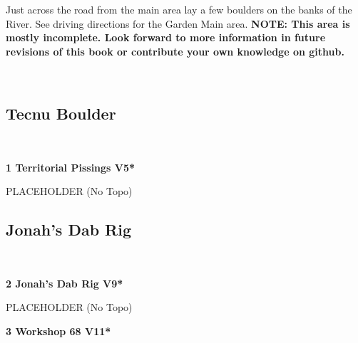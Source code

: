 \raggedcolumns
\begin{multicols}{2}
\begin{minipage}{\columnwidth}
Just across the road from the main area lay a few boulders on the banks of the River. See driving directions for the Garden Main area.
\textbf{NOTE: This area is mostly incomplete. Look forward to more information in future revisions of this book or contribute your own knowledge on github.}
\end{minipage}

\newpage
	\begin{minipage}{\columnwidth}
	\
	\end{minipage}
	
			\begin{minipage}{\columnwidth}
			\subsection*{Tecnu Boulder}\label{bf:Tecnu Boulder}
			\
			
			\end{minipage}
			
					\begin{minipage}{\linewidth}	
					\label{rt:Territorial Pissings}
\colorbox{RoyalBlue!20}{
\parbox{0.95\textwidth}{
\textbf{
1 Territorial Pissings V5*  
}
}
}

					\begin{adjustwidth}{0.5cm}{}				
					PLACEHOLDER
						\newline (No Topo) 
					\end{adjustwidth}
					\end{minipage}
			\begin{minipage}{\columnwidth}
			\subsection*{Jonah's Dab Rig}\label{bf:Jonah's Dab Rig}
			\
			
			\end{minipage}
			
					\begin{minipage}{\linewidth}	
					\label{rt:Jonah's Dab Rig}
\colorbox{Goldenrod!50}{
\parbox{0.95\textwidth}{
\textbf{
2 Jonah's Dab Rig V9*  
}
}
}

					\begin{adjustwidth}{0.5cm}{}				
					PLACEHOLDER
						\newline (No Topo) 
					\end{adjustwidth}
					\end{minipage}
					\begin{minipage}{\linewidth}	
					\label{rt:Workshop 68}
\colorbox{red!20}{
\parbox{0.95\textwidth}{
\textbf{
3 Workshop 68 V11*  
}
}
}


\end{minipage}
\end{multicols}
